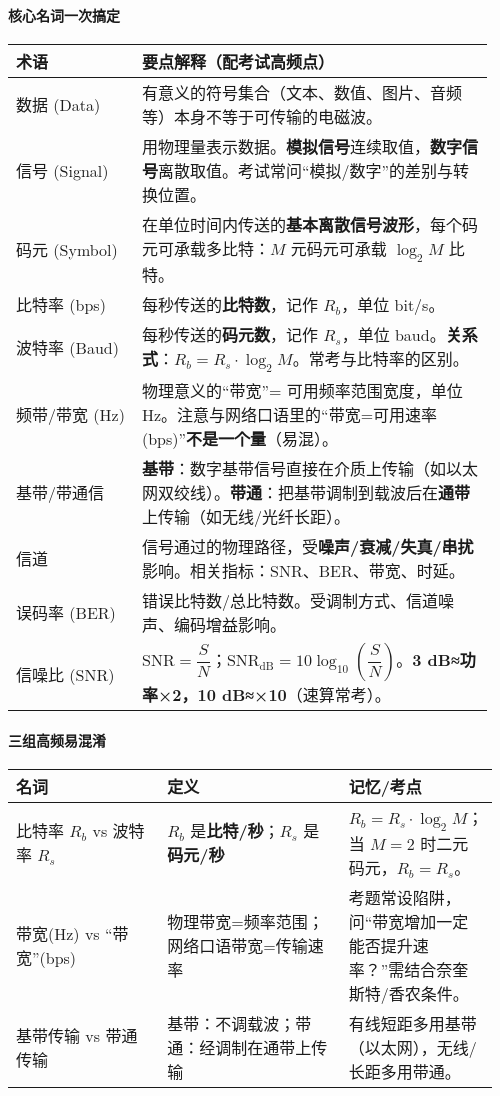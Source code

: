 \documentclass[lang=cn,newtx,10pt,scheme=chinese]{../../elegantbook}
\begin{document}
\paragraph{核心名词一次搞定}
{\small
\begin{longtable}{|p{0.25\linewidth}|p{0.70\linewidth}|}
\hline
	\textbf{术语} & \textbf{要点解释（配考试高频点）} \\
\hline
数据 (Data) & 有意义的符号集合（文本、数值、图片、音频等）本身不等于可传输的电磁波。\\
\hline
信号 (Signal) & 用物理量表示数据。\textbf{模拟信号}连续取值，\textbf{数字信号}离散取值。考试常问“模拟/数字”的差别与转换位置。\\
\hline
码元 (Symbol) & 在单位时间内传送的\textbf{基本离散信号波形}，每个码元可承载多比特：$M$ 元码元可承载 $\log_2 M$ 比特。\\
\hline
比特率 (bps) & 每秒传送的\textbf{比特数}，记作 $R_b$，单位 bit/s。\\
\hline
波特率 (Baud) & 每秒传送的\textbf{码元数}，记作 $R_s$，单位 baud。\textbf{关系式}：$R_b = R_s\cdot \log_2 M$。常考与比特率的区别。\\
\hline
频带/带宽 (Hz) & 物理意义的“带宽”= 可用频率范围宽度，单位 Hz。注意与网络口语里的“带宽=可用速率(bps)”\textbf{不是一个量}（易混）。\\
\hline
基带/带通信 & \textbf{基带}：数字基带信号直接在介质上传输（如以太网双绞线）。\textbf{带通}：把基带调制到载波后在\textbf{通带}上传输（如无线/光纤长距）。\\
\hline
信道 & 信号通过的物理路径，受\textbf{噪声/衰减/失真/串扰}影响。相关指标：SNR、BER、带宽、时延。\\
\hline
误码率 (BER) & 错误比特数/总比特数。受调制方式、信道噪声、编码增益影响。\\
\hline
信噪比 (SNR) & $\mathrm{SNR}=\dfrac{S}{N}$；$\mathrm{SNR_{dB}}=10\log_{10}\!\left(\dfrac{S}{N}\right)$。\textbf{3 dB≈功率×2，10 dB≈×10}（速算常考）。\\
\hline
\end{longtable}
}

\paragraph{三组高频易混淆}
{\small
\begin{longtable}{|p{0.30\linewidth}|p{0.36\linewidth}|p{0.30\linewidth}|}
\hline
	\textbf{名词} & \textbf{定义} & \textbf{记忆/考点} \\
\hline
比特率 $R_b$ vs 波特率 $R_s$ & $R_b$ 是\textbf{比特/秒}；$R_s$ 是\textbf{码元/秒} & $R_b = R_s\cdot \log_2 M$；当 $M=2$ 时二元码元，$R_b=R_s$。\\
\hline
带宽(Hz) vs “带宽”(bps) & 物理带宽=频率范围；网络口语带宽=传输速率 & 考题常设陷阱，问“带宽增加一定能否提升速率？”需结合奈奎斯特/香农条件。\\
\hline
基带传输 vs 带通传输 & 基带：不调载波；带通：经调制在通带上传输 & 有线短距多用基带（以太网），无线/长距多用带通。\\
\hline
\end{longtable}
}
\end{document}
